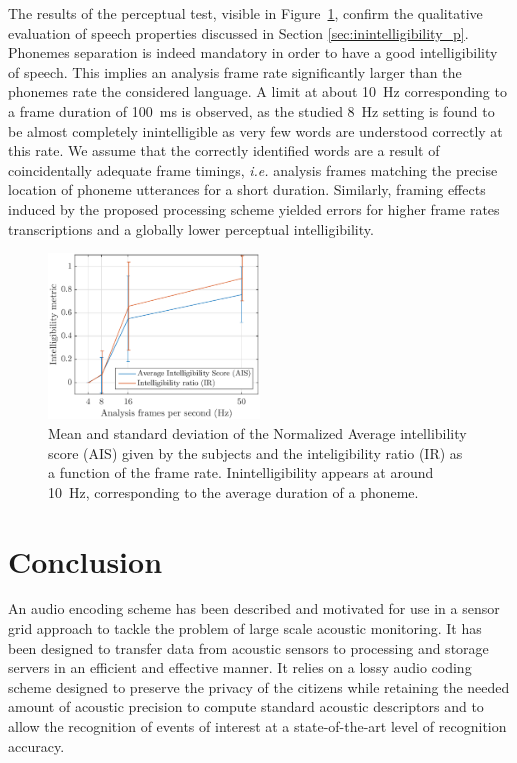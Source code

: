 \documentclass[sensors,article,submit,moreauthors,pdftex,10pt,a4paper]{mdpi}
\begin{document}
The results of the perceptual test, visible in Figure~\ref{fig:subj_int}, confirm the qualitative evaluation of speech properties discussed in Section \ref{sec:inintelligibility_p}. Phonemes separation is indeed mandatory in order to have a good intelligibility of speech. This implies an analysis frame rate significantly larger than the phonemes rate the considered language. A limit at about 10~Hz corresponding to a frame duration of 100~ms is observed, as the studied 8~Hz setting is found to be almost completely inintelligible as very few words are understood correctly at this rate. We assume that the correctly identified words are a result of coincidentally adequate frame timings, \textit{i.e.} analysis frames matching the precise location of phoneme utterances for a short duration. Similarly, framing effects induced by the proposed processing scheme yielded errors for higher frame rates transcriptions and a globally lower perceptual intelligibility.\\

\begin{figure}[htbp]
	\centering
		\includegraphics[width=0.5\textwidth]{figures/subj_int.eps}
	\caption{Mean and standard deviation of the Normalized Average intellibility score (AIS) given by the subjects and the inteligibility ratio (IR) as a function of the frame rate. Inintelligibility appears at around 10~Hz, corresponding to the average duration of a phoneme.}
	\label{fig:subj_int}
\end{figure}

\section{Conclusion}

An audio encoding scheme has been described and motivated for use in a sensor grid approach to tackle the problem of large scale acoustic monitoring. It has been designed to transfer data from acoustic sensors to processing and storage servers in an efficient and effective manner. It relies on a lossy audio coding scheme designed to preserve the privacy of the citizens while retaining the needed amount of acoustic precision to compute standard acoustic descriptors and to allow the recognition of events of interest at a state-of-the-art level of recognition accuracy.
\end{document}
